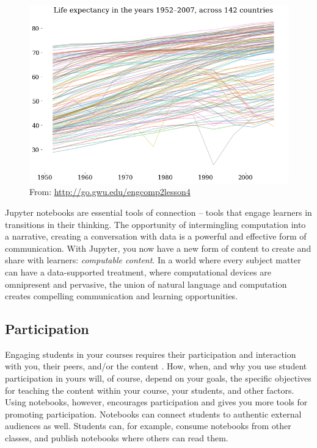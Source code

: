 \documentclass[]{book}
\begin{document}
\begin{figure}
\centering
\includegraphics{images/engcomp2lesson4-life-expectancy.png}
\caption{From: \url{http://go.gwu.edu/engcomp2lesson4}}
\end{figure}

Jupyter notebooks are essential tools of connection -- tools that engage
learners in transitions in their thinking. The opportunity of
intermingling computation into a narrative, creating a conversation with
data is a powerful and effective form of communication. With Jupyter,
you now have a new form of content to create and share with learners:
\emph{computable content}. In a world where every subject matter can
have a data-supported treatment, where computational devices are
omnipresent and pervasive, the union of natural language and computation
creates compelling communication and learning opportunities.

\subsection{Participation}\label{participation}

Engaging students in your courses requires their participation and
interaction with you, their peers, and/or the content
\citep{moore1989three}. How, when, and why you use student participation
in yours will, of course, depend on your goals, the specific objectives
for teaching the content within your course, your students, and other
factors. Using notebooks, however, encourages participation and gives
you more tools for promoting participation. Notebooks can connect
students to authentic external audiences as well. Students can, for
example, consume notebooks from other classes, and publish notebooks
where others can read them.
\end{document}

